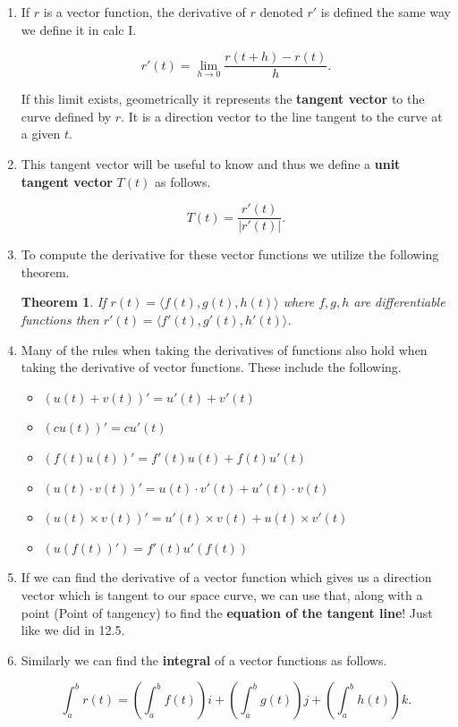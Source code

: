 \documentclass[11pt]{article}
\newtheorem{theorem}{Theorem}
\begin{document}
\begin{enumerate}
\item  If $r$ is a vector function, the derivative of $r$ denoted $r'$ is defined the same way we define it in calc I.

\begin{equation*}
    r'(t) = \lim_{h \to 0}\frac{r(t+h)-r(t)}{h}.
\end{equation*}



If this limit exists, geometrically it represents the \textbf{tangent vector} to the curve defined by $r$. It is a direction vector to the line tangent to the curve at a given $t$.

\item  This tangent vector will be useful to know and thus we define a \textbf{unit tangent vector} $T(t)$ as follows.

\begin{equation*}
    T(t) = \frac{r'(t)}{|r'(t)|}.
\end{equation*}

\item To compute the derivative for these vector functions we utilize the following theorem.

\begin{theorem}
    If $r(t) = \langle f(t),g(t),h(t) \rangle$ where $f,g,h$ are differentiable functions then $r'(t) = \langle f'(t), g'(t), h'(t) \rangle$. 
\end{theorem}

\item Many of the rules when taking the derivatives of functions also hold when taking the derivative of vector functions. These include the following.

\begin{itemize}
    \item $(u(t)+v(t))' = u'(t) + v'(t)$
    \item $(cu(t))' = cu'(t)$
    \item $(f(t)u(t))' = f'(t)u(t)+f(t)u'(t)$
    \item $(u(t)\cdot v(t))' = u(t)\cdot v'(t)+u'(t) \cdot v(t)$
    \item $(u(t) \times v(t))' = u'(t)\times v(t) + u(t) \times v'(t)$
    \item $(u(f(t))') = f'(t)u'(f(t))$
\end{itemize}

\item If we can find the derivative of a vector function which gives us a direction vector which is tangent to our space curve, we can use that, along with a point (Point of tangency) to find the \textbf{equation of the tangent line}! Just like we did in 12.5.

\item Similarly we can find the \textbf{integral} of a vector functions as follows.

\begin{equation*}
    \int_a^b r(t) = \left(\int_a^b f(t)\right) i + \left(\int_a^b g(t)\right) j + \left(\int_a^b h(t)\right) k.
\end{equation*}
   
   \end{enumerate}
\end{document}
